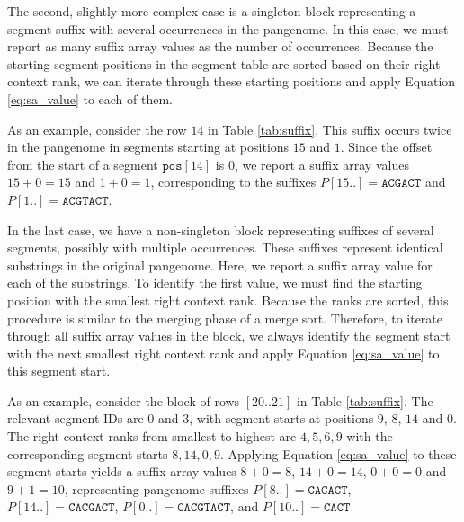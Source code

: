 The second, slightly more complex case is a singleton block representing a segment suffix with several occurrences in the pangenome.
In this case, we must report as many suffix array values as the number of occurrences.
Because the starting segment positions in the segment table are sorted based on their right context rank, we can iterate through these starting positions and apply Equation \ref{eq:sa_value} to each of them.

As an example, consider the row $14$ in Table \ref{tab:suffix}.
This suffix occurs twice in the pangenome in segments starting at positions $15$ and $1$.
Since the offset from the start of a segment $\texttt{pos}[14]$ is $0$, we report a suffix array values $15 + 0 = 15$ and $1 + 0 = 1$, corresponding to the suffixes $P[15..] = \texttt{ACGACT}$ and $P[1..] = \texttt{ACGTACT}$.

In the last case, we have a non-singleton block representing suffixes of several segments, possibly with multiple occurrences.
These suffixes represent identical substrings in the original pangenome.
Here, we report a suffix array value for each of the substrings.
To identify the first value, we must find the starting position with the smallest right context rank.
Because the ranks are sorted, this procedure is similar to the merging phase of a merge sort.
Therefore, to iterate through all suffix array values in the block, we always identify the segment start with the next smallest right context rank and apply Equation \ref{eq:sa_value} to this segment start.

As an example, consider the block of rows $[20..21]$ in Table \ref{tab:suffix}.
The relevant segment IDs are $0$ and $3$, with segment starts at positions $9$, $8$, $14$ and $0$.
The right context ranks from smallest to highest are $4, 5, 6, 9$ with the corresponding segment starts $8, 14, 0, 9$.
Applying Equation \ref{eq:sa_value} to these segment starts yields a suffix array values $8 + 0 = 8$, $14 + 0 = 14$, $0 + 0 = 0$ and $9 + 1 = 10$, representing pangenome suffixes $P[8..] = \texttt{CACACT}$, $P[14..] = \texttt{CACGACT}$, $P[0..] = \texttt{CACGTACT}$, and $P[10..] = \texttt{CACT}$.

